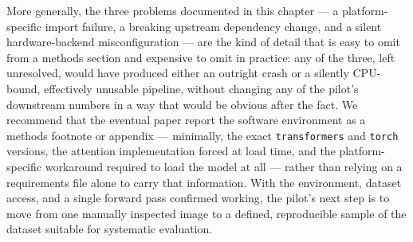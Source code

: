 More generally, the three problems documented in this chapter --- a platform-specific import
failure, a breaking upstream dependency change, and a silent hardware-backend misconfiguration ---
are the kind of detail that is easy to omit from a methods section and expensive to omit in
practice: any of the three, left unresolved, would have produced either an outright crash or a
silently CPU-bound, effectively unusable pipeline, without changing any of the pilot's downstream
numbers in a way that would be obvious after the fact. We recommend that the eventual paper report
the software environment as a methods footnote or appendix --- minimally, the exact
\texttt{transformers} and \texttt{torch} versions, the attention implementation forced at load
time, and the platform-specific workaround required to load the model at all --- rather than
relying on a requirements file alone to carry that information. With the environment, dataset
access, and a single forward pass confirmed working, the pilot's next step is to move from one
manually inspected image to a defined, reproducible sample of the dataset suitable for systematic
evaluation.
